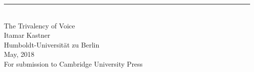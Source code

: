 \singlespacing
\begin{center}
\rule{165pt}{0pt} \\
\vspace{1cm}
\LARGE{The Trivalency of Voice}\\
\vspace{2cm}
\large{Itamar Kastner} \\
\vspace{0.4cm}
\normalsize{Humboldt-Universit\"at zu Berlin} \\
\vspace{1cm}
\normalsize{May, 2018} \\
\vspace{4cm}
\hfill \large{For submission to Cambridge University Press}\\

\end{center}